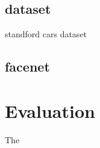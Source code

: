 \documentclass[a4paper,12pt,titlepage, twoside]{article}
\numberwithin{figure}{section}
\begin{document}
\subsection{dataset}
standford \cite{standford} cars dataset

\subsection{facenet}
\label{sec:facenet}


\section{Evaluation}
The 






{}
\cleardoublepage
\clearpage
\end{document}
